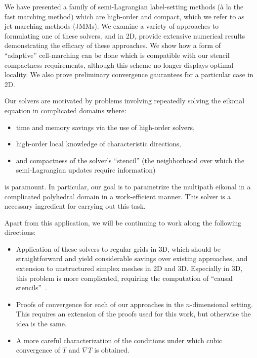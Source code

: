 \documentclass{siamart190516}
\begin{document}
We have presented a family of semi-Lagrangian label-setting methods
(\`{a} la the fast marching method) which are high-order and compact,
which we refer to as jet marching methods (JMMs). We examine a variety
of approaches to formulating one of these solvers, and in 2D, provide
extensive numerical results demonstrating the efficacy of these
approaches. We show how a form of ``adaptive'' cell-marching can be
done which is compatible with our stencil compactness requirements,
although this scheme no longer displays optimal locality. We also
prove preliminary convergence gaurantees for a particular case in 2D.

Our solvers are motivated by problems involving repeatedly solving the
eikonal equation in complicated domains where:
\begin{itemize}
\item time and memory savings via the use of high-order solvers,
\item high-order local knowledge of characteristic directions,
\item and compactness of the solver's ``stencil'' (the neighborhood
  over which the semi-Lagrangian updates require information)
\end{itemize}
is paramount. In particular, our goal is to parametrize the multipath
eikonal in a complicated polyhedral domain in a work-efficient
manner. This solver is a necessary ingredient for carrying out this
task.

Apart from this application, we will be continuing to work along the
following directions:
\begin{itemize}
\item Application of these solvers to regular grids in 3D, which
  should be straightforward and yield considerable savings over
  existing approaches, and extension to unstructured simplex meshes in
  2D and 3D. Especially in 3D, this problem is more complicated,
  requiring the computation of ``causal
  stencils''~\cite{Kimmel:1998aa,Sethian:2000aa}.
\item Proofs of convergence for each of our approaches in the
  $n$-dimensional setting. This requires an extension of the proofs
  used for this work, but otherwise the idea is the same.
\item A more careful characterization of the conditions under which
  cubic convergence of $T$ and $\nabla T$ is obtained.
\end{itemize}



\end{document}
